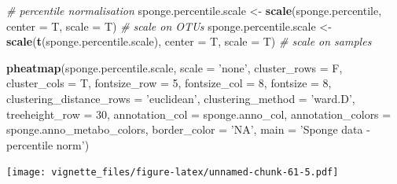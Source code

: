 \documentclass[]{book}
\newenvironment{Shaded}{\begin{snugshade}}{\end{snugshade}}
\newcommand{\KeywordTok}[1]{\textcolor[rgb]{0.13,0.29,0.53}{\textbf{#1}}}
\newcommand{\DataTypeTok}[1]{\textcolor[rgb]{0.13,0.29,0.53}{#1}}
\newcommand{\DecValTok}[1]{\textcolor[rgb]{0.00,0.00,0.81}{#1}}
\newcommand{\StringTok}[1]{\textcolor[rgb]{0.31,0.60,0.02}{#1}}
\newcommand{\CommentTok}[1]{\textcolor[rgb]{0.56,0.35,0.01}{\textit{#1}}}
\newcommand{\NormalTok}[1]{#1}
\begin{document}
\begin{Shaded}
\begin{Highlighting}[]
\CommentTok{# percentile normalisation}
\NormalTok{sponge.percentile.scale <-}\StringTok{ }\KeywordTok{scale}\NormalTok{(sponge.percentile, }\DataTypeTok{center =}\NormalTok{ T, }\DataTypeTok{scale =}\NormalTok{ T) }
\CommentTok{# scale on OTUs}
\NormalTok{sponge.percentile.scale <-}\StringTok{ }\KeywordTok{scale}\NormalTok{(}\KeywordTok{t}\NormalTok{(sponge.percentile.scale), }\DataTypeTok{center =}\NormalTok{ T, }\DataTypeTok{scale =}\NormalTok{ T) }
\CommentTok{# scale on samples}

\KeywordTok{pheatmap}\NormalTok{(sponge.percentile.scale, }
         \DataTypeTok{scale =} \StringTok{'none'}\NormalTok{, }
         \DataTypeTok{cluster_rows =}\NormalTok{ F, }
         \DataTypeTok{cluster_cols =}\NormalTok{ T, }
         \DataTypeTok{fontsize_row =} \DecValTok{5}\NormalTok{, }\DataTypeTok{fontsize_col =} \DecValTok{8}\NormalTok{,}
         \DataTypeTok{fontsize =} \DecValTok{8}\NormalTok{,}
         \DataTypeTok{clustering_distance_rows =} \StringTok{'euclidean'}\NormalTok{,}
         \DataTypeTok{clustering_method =} \StringTok{'ward.D'}\NormalTok{,}
         \DataTypeTok{treeheight_row =} \DecValTok{30}\NormalTok{,}
         \DataTypeTok{annotation_col =}\NormalTok{ sponge.anno_col,}
         \DataTypeTok{annotation_colors =}\NormalTok{ sponge.anno_metabo_colors,}
         \DataTypeTok{border_color =} \StringTok{'NA'}\NormalTok{,}
         \DataTypeTok{main =} \StringTok{'Sponge data - percentile norm'}\NormalTok{)}
\end{Highlighting}
\end{Shaded}

\texttt{[image: vignette\_files/figure-latex/unnamed-chunk-61-5.pdf]}
\end{document}
